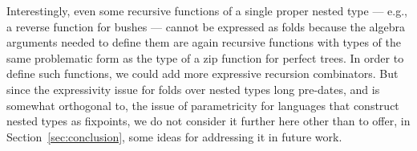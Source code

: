 \documentclass[runningheads]{llncs}
\newcommand{\fold}{\mathsf{fold}}
\begin{document}
Interestingly, even some recursive functions of a single proper nested
type --- e.g., a reverse function for bushes --- cannot be expressed
as folds because the algebra arguments needed to define them are again
recursive functions with types of the same problematic form as the
type of a zip function for perfect trees.  In order to define such
functions, we could add more expressive recursion combinators.  But
since the expressivity issue for folds over nested types long
pre-dates, and is somewhat orthogonal to, the issue of parametricity
for languages that construct nested types as fixpoints, we do not
consider it further here other than to offer, in
Section~\ref{sec:conclusion}, some ideas for addressing it in future
work.



\begin{comment}

representing the Agda
$\mathtt{reversePTree}$ function from Figure~\ref{fig:funs} as
$\vdash (\fold_{\beta + \phi(\beta \times \beta)}^{\mathit{PTree}\,
  \alpha})_\emptyset \,
s :
\Nat^{\alpha} (\mathit{PTree}\,\alpha)\,(\mathit{PTree}\,\alpha)$,
where

\pagebreak


\end{comment}
\end{document}
